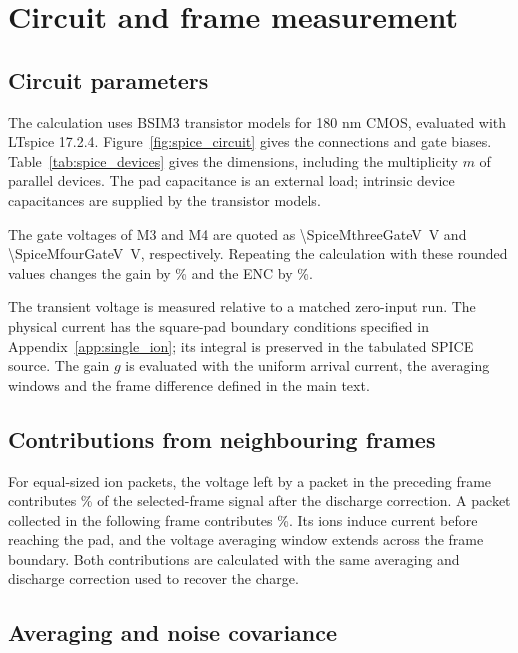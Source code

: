 \section{Circuit and frame measurement}
\label{app:spice_readout}

\subsection{Circuit parameters}

The calculation uses BSIM3 transistor models for 180 nm CMOS, evaluated with
LTspice 17.2.4. Figure~\ref{fig:spice_circuit} gives the connections and gate
biases. Table~\ref{tab:spice_devices} gives the dimensions, including the
multiplicity $m$ of parallel devices. The pad capacitance is an external
load; intrinsic device capacitances are supplied by the transistor models.

The gate voltages of M3 and M4 are quoted as
\SI{\SpiceMthreeGateV}{V} and \SI{\SpiceMfourGateV}{V}, respectively.
Repeating the calculation with these rounded values changes the gain by
\SpiceBiasRoundingGainPercent\% and the ENC by
\SpiceBiasRoundingEncPercent\%.

The transient voltage is measured relative to a matched zero-input run.
The physical current has the square-pad boundary conditions specified in
Appendix~\ref{app:single_ion}; its integral is preserved in the tabulated
SPICE source. The gain $g$ is evaluated with the uniform arrival current,
the averaging windows and the frame difference defined in the main text.

\subsection{Contributions from neighbouring frames}

For equal-sized ion packets, the voltage left by a packet in the preceding
frame contributes \SpicePreviousPercent\% of the selected-frame signal
after the discharge correction. A packet collected in the following frame
contributes \SpiceFollowingPercent\%. Its ions induce current before reaching
the pad, and the voltage averaging window extends across the frame boundary.
Both contributions are calculated with the same averaging and discharge
correction used to recover the charge.

\subsection{Averaging and noise covariance}
\label{app:spice_noise}

